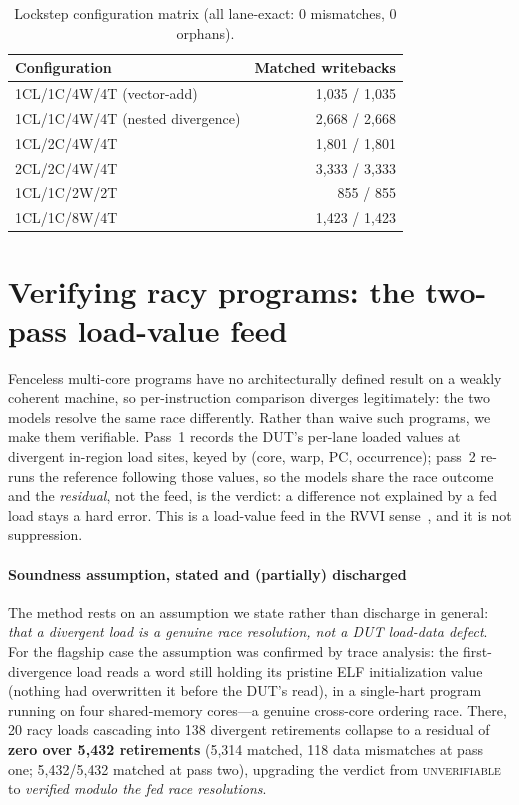 \documentclass[review,12pt]{elsarticle}
\begin{document}
\begin{table}[t]
	\caption{Lockstep configuration matrix (all lane-exact: 0
		mismatches, 0 orphans).}
	\label{tab:matrix}
	\centering
	\small
	\begin{tabular}{lr}
		\toprule
		Configuration                    & Matched writebacks \\
		\midrule
		1CL/1C/4W/4T (vector-add)        & 1{,}035 / 1{,}035  \\
		1CL/1C/4W/4T (nested divergence) & 2{,}668 / 2{,}668  \\
		1CL/2C/4W/4T                     & 1{,}801 / 1{,}801  \\
		2CL/2C/4W/4T                     & 3{,}333 / 3{,}333  \\
		1CL/1C/2W/2T                     & 855 / 855          \\
		1CL/1C/8W/4T                     & 1{,}423 / 1{,}423  \\
		\bottomrule
	\end{tabular}
\end{table}

\section{Verifying racy programs: the two-pass load-value feed}
\label{sec:feed}
Fenceless multi-core programs have no architecturally defined result
on a weakly coherent machine, so per-instruction comparison diverges
legitimately: the two models resolve the same race differently.
Rather than waive such programs, we make them verifiable. Pass~1
records the DUT's per-lane loaded values at divergent in-region load
sites, keyed by (core, warp, PC, occurrence); pass~2 re-runs the
reference following those values, so the models share the race
outcome and the \emph{residual}, not the feed, is the verdict: a
difference not explained by a fed load stays a hard error. This is a
load-value feed in the RVVI sense~\cite{rvvi}, and it is not
suppression.

\paragraph{Soundness assumption, stated and (partially) discharged}
The method rests on an assumption we state rather than discharge in
general: \emph{that a divergent load is a genuine race resolution,
	not a DUT load-data defect}. For the flagship case the assumption was
confirmed by trace analysis: the first-divergence load reads a word
still holding its pristine ELF initialization value (nothing had
overwritten it before the DUT's read), in a single-hart program
running on four shared-memory cores---a genuine cross-core ordering
race. There, 20 racy loads cascading into 138 divergent retirements
collapse to a residual of \textbf{zero over 5{,}432 retirements}
(5{,}314 matched, 118 data mismatches at pass one; 5{,}432/5{,}432
matched at pass two), upgrading the verdict from
\textsc{unverifiable} to \emph{verified modulo the fed race
	resolutions}.
\end{document}
